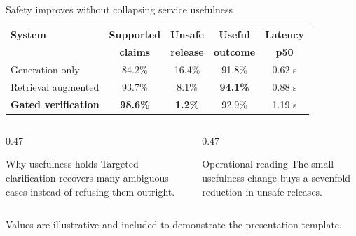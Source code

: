 \begin{frame}{Safety improves without collapsing service usefulness}
  \centering
  \small
  \renewcommand{\arraystretch}{1.25}
  \begin{tabular}{>{\raggedright\arraybackslash}p{3.7cm}cccc}
    \toprule
    \textbf{System} & \textbf{Supported} & \textbf{Unsafe} & \textbf{Useful} & \textbf{Latency} \\
                    & \textbf{claims} & \textbf{release} & \textbf{outcome} & \textbf{p50} \\
    \midrule
    Generation only       & 84.2\% & 16.4\% & 91.8\% & 0.62 s \\
    Retrieval augmented   & 93.7\% &  8.1\% & \textbf{94.1\%} & 0.88 s \\
    \rowcolor{ArborMaize!20}
    \textbf{Gated verification} & \textbf{98.6\%} & \textbf{1.2\%} & 92.9\% & 1.19 s \\
    \bottomrule
  \end{tabular}

  \vspace{0.45cm}
  \begin{columns}[T,onlytextwidth]
    \begin{column}{0.47\textwidth}
      \begin{block}{Why usefulness holds}
        Targeted clarification recovers many ambiguous cases instead of refusing them outright.
      \end{block}
    \end{column}
    \begin{column}{0.47\textwidth}
      \begin{exampleblock}{Operational reading}
        The small usefulness change buys a sevenfold reduction in unsafe releases.
      \end{exampleblock}
    \end{column}
  \end{columns}

  \vfill
  {\tiny Values are illustrative and included to demonstrate the presentation template.}
\end{frame}
